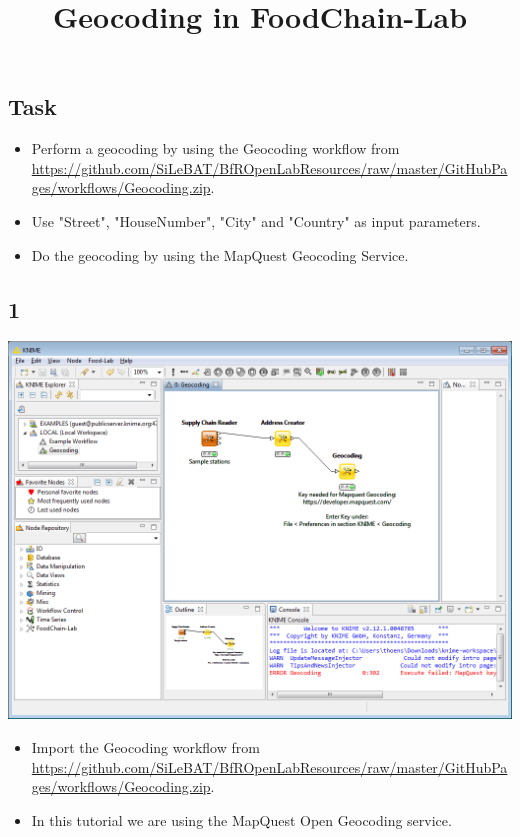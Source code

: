 \documentclass{beamer}
\title{Geocoding in FoodChain-Lab}
\date{}
\begin{document}
\maketitle

\section{ }

\subsection{Task}
\begin{frame}
	\begin{itemize}
		\item Perform a geocoding by using the Geocoding workflow from \url{https://github.com/SiLeBAT/BfROpenLabResources/raw/master/GitHubPages/workflows/Geocoding.zip}.
		\item Use "Street", "HouseNumber", "City" and "Country" as input parameters.
		\item Do the geocoding by using the MapQuest Geocoding Service.
	\end{itemize}
\end{frame}
 
\subsection{1}
\begin{frame}
	\begin{center}
  		\includegraphics[height=0.6\textheight]{1.png}
	\end{center}
	\begin{itemize}
		\item Import the Geocoding workflow from \url{https://github.com/SiLeBAT/BfROpenLabResources/raw/master/GitHubPages/workflows/Geocoding.zip}.
		\item In this tutorial we are using the MapQuest Open Geocoding service.
	\end{itemize}
\end{frame}
\end{document}
